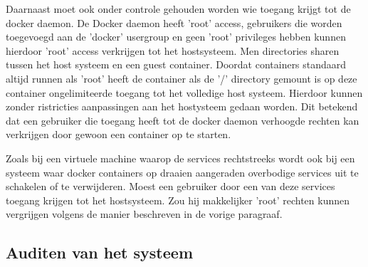Daarnaast moet ook onder controle gehouden worden wie toegang krijgt tot de docker daemon. De Docker daemon heeft 'root' access, gebruikers die worden toegevoegd aan de 'docker' usergroup en geen 'root' privileges hebben kunnen hierdoor 'root' access verkrijgen tot het hostsysteem. Men directories sharen tussen het host systeem en een guest container. Doordat containers standaard altijd runnen als 'root' heeft de container als de '/' directory gemount is op deze container ongelimiteerde toegang tot het volledige host systeem. Hierdoor kunnen zonder ristricties aanpassingen aan het hostysteem gedaan worden. Dit betekend dat een gebruiker die toegang heeft tot de docker daemon verhoogde rechten kan verkrijgen door gewoon een container op te starten.

Zoals bij een virtuele machine waarop de services rechtstreeks wordt ook bij een systeem waar docker containers op draaien aangeraden overbodige services uit te schakelen of te verwijderen. Moest een gebruiker door een van deze services toegang krijgen tot het hostsysteem. Zou hij makkelijker 'root' rechten kunnen vergrijgen volgens de manier beschreven in de vorige paragraaf.

\subsection{Auditen van het systeem}

